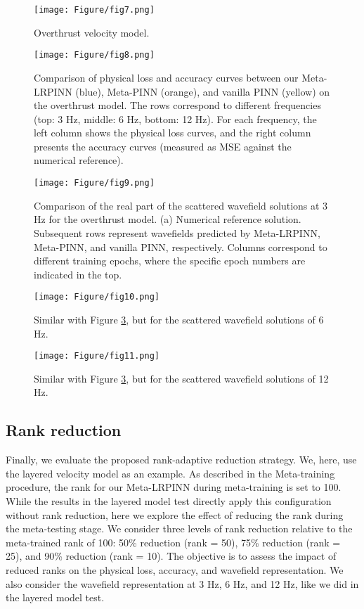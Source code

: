 \begin{figure}[htbp]
\centering
\texttt{[image: Figure/fig7.png]}
\caption{Overthrust velocity model.}
\label{fig7}
\end{figure}


\begin{figure}[htbp]
\centering
\texttt{[image: Figure/fig8.png]}
\caption{Comparison of physical loss and accuracy curves between our Meta-LRPINN (blue), Meta-PINN (orange), and vanilla PINN (yellow) on the overthrust model. The rows correspond to different frequencies (top: 3 Hz, middle: 6 Hz, bottom: 12 Hz). For each frequency, the left column shows the physical loss curves, and the right column presents the accuracy curves (measured as MSE against the numerical reference).}
\label{fig8}
\end{figure}

\begin{figure}[htbp]
\centering
\texttt{[image: Figure/fig9.png]}
\caption{Comparison of the real part of the scattered wavefield solutions at 3 Hz for the overthrust model. (a) Numerical reference solution. Subsequent rows represent wavefields predicted by Meta-LRPINN, Meta-PINN, and vanilla PINN, respectively. Columns correspond to different training epochs, where the specific epoch numbers are indicated in the top.}
\label{fig9}
\end{figure}

\begin{figure}[htbp]
\centering
\texttt{[image: Figure/fig10.png]}
\caption{Similar with Figure \ref{fig9}, but for the scattered wavefield solutions of 6 Hz.}
\label{fig10}
\end{figure}

\begin{figure}[htbp]
\centering
\texttt{[image: Figure/fig11.png]}
\caption{Similar with Figure \ref{fig9}, but for the scattered wavefield solutions of 12 Hz.}
\label{fig11}
\end{figure}


\subsection{Rank reduction}
Finally, we evaluate the proposed rank-adaptive reduction strategy. We, here, use the layered velocity model as an example. As described in the Meta-training procedure, the rank for our Meta-LRPINN during meta-training is set to 100. While the results in the layered model test directly apply this configuration without rank reduction, here we explore the effect of reducing the rank during the meta-testing stage. We consider three levels of rank reduction relative to the meta-trained rank of 100: 50\% reduction (rank = 50), 75\% reduction (rank = 25), and 90\% reduction (rank = 10). The objective is to assess the impact of reduced ranks on the physical loss, accuracy, and wavefield representation. We also consider the wavefield representation at 3 Hz, 6 Hz, and 12 Hz, like we did in the layered model test. 

